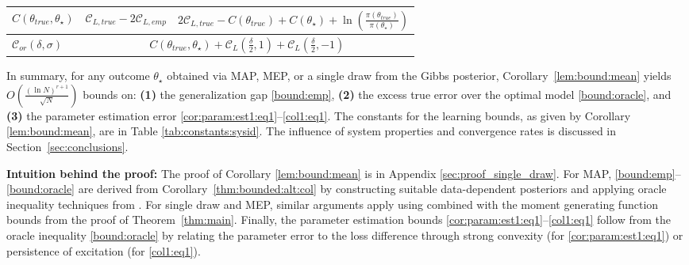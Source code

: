 \documentclass{article}
\begin{document}
\begin{table}[ht]
\begin{tabular}{|l|c|c|}
\hline
$C(\theta_{true},\theta_{\star})$ & $\mathcal{C}_{L,true}-2\mathcal{C}_{L,emp}$ & $2\mathcal{C}_{L,true}-C(\theta_{true})+C(\theta_{\star})+\ln\left(\frac{\pi(\theta_{true})}{\pi(\theta_{\star})}\right)$ \\
\hline
$\mathcal{C}_{or}(\delta,\sigma)$ & \multicolumn{2}{c|}{$C(\theta_{true},\theta_{\star})+\mathcal{C}_L(\frac{\delta}{2},1)+\mathcal{C}_L(\frac{\delta}{2},-1)$} \\
\hline
\end{tabular}
\end{table}
In summary, for any outcome $\theta_{\star}$ obtained via MAP, MEP, or a single draw from the Gibbs posterior, Corollary~\ref{lem:bound:mean} yields $O\left(\frac{(\ln N)^{r+1}}{\sqrt{N}}\right)$ bounds on: \textbf{(1)} the generalization gap \eqref{bound:emp}, \textbf{(2)} the excess true error over the optimal model \eqref{bound:oracle}, and \textbf{(3)} the parameter estimation error \eqref{cor:param:est1:eq1}--\eqref{col1:eq1}. The constants for the learning bounds, as given by Corollary \ref{lem:bound:mean}, are in Table \ref{tab:constants:sysid}. The influence of system properties and convergence rates is discussed in Section~\ref{sec:conclusions}.

\textbf{Intuition behind the proof:}
The proof of Corollary \ref{lem:bound:mean} is in Appendix \ref{sec:proof_single_draw}.  For MAP, \eqref{bound:emp}--\eqref{bound:oracle} are derived from Corollary~\ref{thm:bounded:alt:col} by constructing suitable data-dependent posteriors and applying oracle inequality techniques from \cite[Theorem 4.1]{alquier2021userfriendly}. For single draw and MEP, similar arguments apply using \cite[Theorems 2.7 and Corollary 2.6]{alquier2021userfriendly} combined with the moment generating function bounds from  the proof of Theorem~\ref{thm:main}. Finally, the parameter estimation bounds \eqref{cor:param:est1:eq1}--\eqref{col1:eq1} follow from the oracle inequality \eqref{bound:oracle} by relating the parameter error to the loss difference through strong convexity (for \eqref{cor:param:est1:eq1}) or persistence of excitation (for \eqref{col1:eq1}).
\end{document}
